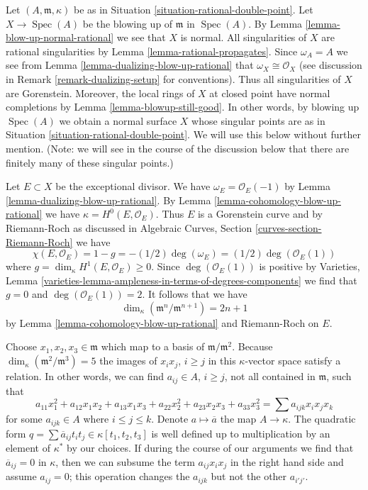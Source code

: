 \documentclass{stacks-project}
\theoremstyle{plain}
\theoremstyle{definition}
\theoremstyle{remark}
\numberwithin{equation}{subsection}
\def\Spec{\mathop{\mathrm{Spec}}}
\begin{document}
\noindent
Let $(A, \mathfrak m, \kappa)$ be as in
Situation \ref{situation-rational-double-point}.
Let $X \to \Spec(A)$ be the blowing up of $\mathfrak m$ in $\Spec(A)$.
By Lemma \ref{lemma-blow-up-normal-rational} we see that $X$ is normal.
All singularities of $X$ are rational singularities
by Lemma \ref{lemma-rational-propagates}.
Since $\omega_A = A$ we see from Lemma \ref{lemma-dualizing-blow-up-rational}
that $\omega_X \cong \mathcal{O}_X$ (see discussion in
Remark \ref{remark-dualizing-setup} for conventions).
Thus all singularities of $X$ are Gorenstein.
Moreover, the local rings of $X$ at closed point have
normal completions by Lemma \ref{lemma-blowup-still-good}.
In other words, by blowing up $\Spec(A)$ we obtain a normal
surface $X$ whose singular points are as in
Situation \ref{situation-rational-double-point}.
We will use this below without further mention.
(Note: we will see in the course of the discussion below
that there are finitely many of these singular points.)

\medskip\noindent
Let $E \subset X$ be the exceptional divisor. We have
$\omega_E = \mathcal{O}_E(-1)$ by Lemma \ref{lemma-dualizing-blow-up-rational}.
By Lemma \ref{lemma-cohomology-blow-up-rational} we have
$\kappa = H^0(E, \mathcal{O}_E)$.
Thus $E$ is a Gorenstein curve and by Riemann-Roch as discussed in
Algebraic Curves, Section \ref{curves-section-Riemann-Roch}
we have
$$
\chi(E, \mathcal{O}_E) = 1 - g = -(1/2) \deg(\omega_E) =
(1/2)\deg(\mathcal{O}_E(1))
$$
where $g = \dim_\kappa H^1(E, \mathcal{O}_E) \geq 0$.
Since $\deg(\mathcal{O}_E(1))$ is positive
by Varieties, Lemma
\ref{varieties-lemma-ampleness-in-terms-of-degrees-components}
we find that $g = 0$ and $\deg(\mathcal{O}_E(1)) = 2$. It follows that
we have
$$
\dim_\kappa (\mathfrak m^n/\mathfrak m^{n + 1}) = 2n + 1
$$
by Lemma \ref{lemma-cohomology-blow-up-rational} and Riemann-Roch
on $E$.

\medskip\noindent
Choose $x_1, x_2, x_3 \in \mathfrak m$ which map to a basis of
$\mathfrak m/\mathfrak m^2$. Because
$\dim_\kappa(\mathfrak m^2/\mathfrak m^3) = 5$
the images of $x_i x_j$, $i \geq j$ in this $\kappa$-vector space
satisfy a relation. In other words, we can find $a_{ij} \in A$,
$i \geq j$, not all contained in $\mathfrak m$, such that
$$
a_{11} x_1^2 + a_{12} x_1x_2 + a_{13}x_1x_3 + a_{22} x_2^2 +
a_{23} x_2x_3 + a_{33} x_3^2 =
\sum a_{ijk} x_ix_jx_k
$$
for some $a_{ijk} \in A$ where $i \leq j \leq k$. Denote
$a \mapsto \overline{a}$ the map $A \to \kappa$.
The quadratic form
$q = \sum \overline{a}_{ij} t_i t_j \in \kappa[t_1, t_2, t_3]$
is well defined up to multiplication by an element of $\kappa^*$
by our choices. If during the course of our arguments we find
that $\overline{a}_{ij} = 0$ in $\kappa$,
then we can subsume the term $a_{ij} x_i x_j$ in the right
hand side and assume $a_{ij} = 0$; this operation changes the $a_{ijk}$
but not the other $a_{i'j'}$.
\end{document}
